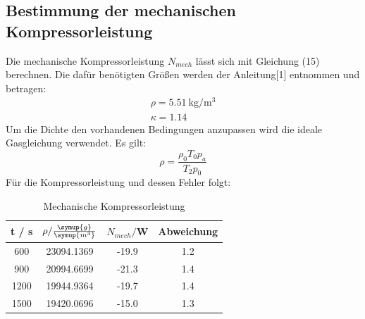 \subsection{Bestimmung der mechanischen Kompressorleistung}
Die mechanische Kompressorleistung $N_{mech}$ lässt sich mit Gleichung (15) berechnen. Die dafür
benötigten Größen werden der Anleitung[1] entnommen und betragen:
\begin{align}
  \rho = \SI{5.51}{\kilo\gram\per\cubic\meter} \\
  \kappa = 1.14
\end{align}
Um die Dichte den vorhandenen Bedingungen anzupassen wird die ideale Gasgleichung
verwendet. Es gilt:
\begin{equation}
  \rho = \frac{\rho_0 T_0 p_a}{T_2 p_0}
\end{equation}
Für die Kompressorleistung und dessen Fehler folgt:
\begin{table}
  \centering
  \caption{Mechanische Kompressorleistung}
  \label{tab:Mechanische Kompressorleistung}
  \begin{tabular}{c c c c}
    \toprule
    t / s  &$\rho/\frac{\symup{g}}{\symup{m^3}}$ & $N_{mech}/$W & Abweichung \\
    \midrule
     600 & 23094.1369 & -19.9 & 1.2 \\
     900 & 20994.6699 & -21.3 & 1.4 \\
    1200 & 19944.9364 & -19.7 & 1.4 \\
    1500 & 19420.0696 & -15.0 & 1.3 \\
    \bottomrule
  \end{tabular}
\end{table}
